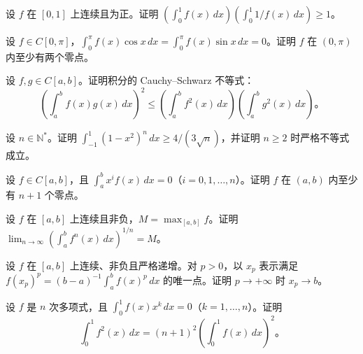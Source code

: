 \noindent\begin{minipage}{\textwidth}
设 $f$ 在 $[0,1]$ 上连续且为正。证明 $(\int_0^1 f(x)\,dx)(\int_0^1 1/f(x)\,dx)\ge1$。
\end{minipage}\par\vfill
\newpage
\noindent\begin{minipage}{\textwidth}
设 $f\in C[0,\pi]$，$\int_0^\pi f(x)\cos x\,dx=\int_0^\pi f(x)\sin x\,dx=0$。证明 $f$ 在 $(0,\pi)$ 内至少有两个零点。
\end{minipage}\par\vfill
\noindent\begin{minipage}{\textwidth}
设 $f,g\in C[a,b]$。证明积分的 Cauchy--Schwarz 不等式：\[(\int_a^b f(x)g(x)\,dx)^2\le(\int_a^b f^2(x)\,dx)(\int_a^b g^2(x)\,dx)\text{。}\]
\end{minipage}\par\vfill
\noindent\begin{minipage}{\textwidth}
设 $n\in\mathbb N^*$。证明 $\int_{-1}^1(1-x^2)^n\,dx\ge4/(3\sqrt n)$，并证明 $n\ge2$ 时严格不等式成立。
\end{minipage}\par\vfill
\newpage
\noindent\begin{minipage}{\textwidth}
设 $f\in C[a,b]$，且 $\int_a^b x^i f(x)\,dx=0$（$i=0,1,\ldots,n$）。证明 $f$ 在 $(a,b)$ 内至少有 $n+1$ 个零点。
\end{minipage}\par\vfill
\noindent\begin{minipage}{\textwidth}
设 $f$ 在 $[a,b]$ 上连续且非负，$M=\max_{[a,b]}f$。证明 $\lim_{n\to\infty}(\int_a^b f^n(x)\,dx)^{1/n}=M$。
\end{minipage}\par\vfill
\noindent\begin{minipage}{\textwidth}
设 $f$ 在 $[a,b]$ 上连续、非负且严格递增。对 $p>0$，以 $x_p$ 表示满足 $f(x_p)^p=(b-a)^{-1}\int_a^b f(x)^p\,dx$ 的唯一点。证明 $p\to+\infty$ 时 $x_p\to b$。
\end{minipage}\par\vfill
\newpage
\noindent\begin{minipage}{\textwidth}
设 $f$ 是 $n$ 次多项式，且 $\int_0^1f(x)x^k\,dx=0$（$k=1,\ldots,n$）。证明 \[\int_0^1f^2(x)\,dx=(n+1)^2(\int_0^1 f(x)\,dx)^2\text{。}\]
\end{minipage}\par\vfill
